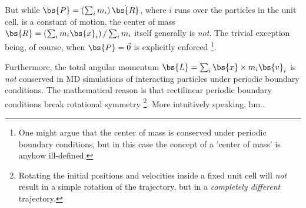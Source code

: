 \documentclass{scrartcl}
\begin{document}
But while 
$\bs{P} = \left(\sum_i m_i\right) \dot{\bs{R}}$,
where $i$ runs over the particles in the unit cell,
is a constant of motion,
the center of mass 
$\bs{R} = \left(\sum_i m_i \bs{x}_i\right) / \sum_i m_i$ 
itself generally is 
\emph{not}. The trivial exception being, of course, when 
$\bs{P}=\vec{0}$ is explicitly enforced%
\footnote{One might argue that the center of mass is conserved under 
    periodic boundary conditions, but in this case the concept of a 
    'center of mass' is anyhow ill-defined.}.

Furthermore, the total angular momentum
$\bs{L} = \sum_i \bs{x} \times m_i\bs{v}_i$
is \emph{not} conserved in MD simulations of interacting
particles under periodic boundary conditions. 
The mathematical reason is that rectilinear periodic boundary conditions
break rotational symmetry%
\footnote{Rotating the initial positions and velocities inside 
    a fixed unit cell will \emph{not} result in a simple
    rotation of the trajectory, but in a \emph{completely different}
    trajectory.}.
More intuitively speaking, hm..
\end{document}

